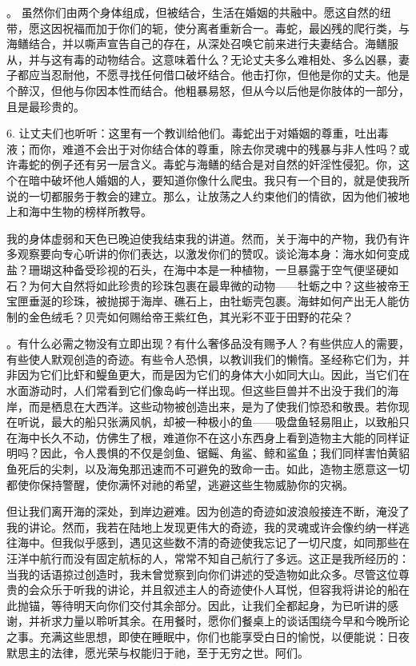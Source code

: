 。 虽然你们由两个身体组成，但被结合，生活在婚姻的共融中。愿这自然的纽带，愿这因祝福而加于你们的轭，使分离者重新合一。毒蛇，最凶残的爬行类，与海鳝结合，并以嘶声宣告自己的存在，从深处召唤它前来进行夫妻结合。海鳝服从，并与这有毒的动物结合。这意味着什么？无论丈夫多么难相处、多么凶暴，妻子都应当忍耐他，不愿寻找任何借口破坏结合。他击打你，但他是你的丈夫。他是个醉汉，但他与你因本性而结合。他粗暴易怒，但从今以后他是你肢体的一部分，且是最珍贵的。\par

6. 让丈夫们也听听：这里有一个教训给他们。毒蛇出于对婚姻的尊重，吐出毒液；而你，难道不会出于对你结合体的尊重，除去你灵魂中的残暴与非人性吗？或许毒蛇的例子还有另一层含义。毒蛇与海鳝的结合是对自然的奸淫性侵犯。你，这个在暗中破坏他人婚姻的人，要知道你像什么爬虫。我只有一个目的，就是使我所说的一切都服务于教会的建立。那么，让放荡之人约束他们的情欲，因为他们被地上和海中生物的榜样所教导。\par

我的身体虚弱和天色已晚迫使我结束我的讲道。然而，关于海中的产物，我仍有许多观察要向专心听讲的你们表达，以激发你们的赞叹。谈论海本身：海水如何变成盐？珊瑚这种备受珍视的石头，在海中本是一种植物，一旦暴露于空气便坚硬如石？为何大自然将如此珍贵的珍珠包裹在最卑微的动物——牡蛎之中？这些被帝王宝匣垂涎的珍珠，被抛掷于海岸、礁石上，由牡蛎壳包裹。海蚌如何产出无人能仿制的金色绒毛？贝壳如何赐给帝王紫红色，其光彩不亚于田野的花朵？\par

。有什么必需之物没有立即出现？有什么奢侈品没有赐予人？有些供应人的需要，有些使人默观创造的奇迹。有些令人恐惧，以教训我们的懒惰。圣经称它们为，并非因为它们比虾和鳀鱼更大，而是因为它们的身体大小如同大山。因此，当它们在水面游动时，人们常看到它们像岛屿一样出现。但这些巨兽并不出没于我们的海岸，而是栖息在大西洋。这些动物被创造出来，是为了使我们惊恐和敬畏。若你现在听说，最大的船只张满风帆，却被一种极小的鱼——吸盘鱼轻易阻止，以致船只在海中长久不动，仿佛生了根，难道你不在这小东西身上看到造物主大能的同样证明吗？因此，令人畏惧的不仅是剑鱼、锯鳐、角鲨、鲸和鲨鱼；我们同样害怕黄貂鱼死后的尖刺，以及海兔那迅速而不可避免的致命一击。如此，造物主愿意这一切都使你保持警醒，使你满怀对祂的希望，逃避这些生物威胁你的灾祸。\par

但让我们离开海的深处，到岸边避难。因为创造的奇迹如波浪般接连不断，淹没了我的讲论。然而，我若在陆地上发现更伟大的奇迹，我的灵魂或许会像约纳一样逃往海中。但我似乎感到，遇见这些数不清的奇迹使我忘记了一切尺度，如同那些在汪洋中航行而没有固定航标的人，常常不知自己航行了多远。这正是我所经历的：当我的话语掠过创造时，我未曾觉察到向你们讲述的受造物如此众多。尽管这位尊贵的会众乐于听我的讲论，并且叙述主人的奇迹使仆人耳悦，但容我将讲论的船在此抛锚，等待明天向你们交付其余部分。因此，让我们全都起身，为已听讲的感谢，并祈求力量以聆听其余。在用餐时，愿你们餐桌上的谈话围绕今早和今晚所论之事。充满这些思想，即使在睡眠中，你们也能享受白日的愉悦，以便能说：日夜默思主的法律，愿光荣与权能归于祂，至于无穷之世。阿们。\par


